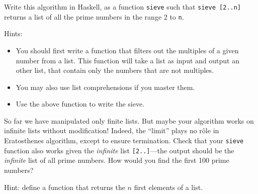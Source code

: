 \documentclass{article}
\begin{document}
Write this algorithm in Haskell, as a function \verb!sieve! such that
\verb!sieve [2..n]! returns a list of all the prime numbers in the
range 2 to \verb!n!. 

Hints:
\begin{itemize}
\item You should first write a function that filters out the multiples
  of a given number from a list. This function will take a list as input
  and output an other list, that contain only the numbers that are not multiples. 

\item
  You may also use list comprehensions if you master them.

\item
  Use the above function to write the sieve. 
\end{itemize}




So far we have manipulated only finite lists. But maybe your algorithm works on
infinite lists without modification!
Indeed, the ``limit'' plays no r\^ole in Eratosthenes algorithm,
except to ensure termination. Check that your \verb!sieve! function
also works given the {\em infinite} list \verb![2..]!---the output
should be the {\em infinite} list of all prime numbers. How would you
find the first 100 prime numbers? 

Hint: define a function that returns the $n$ first elements of a list. 
\end{document}
